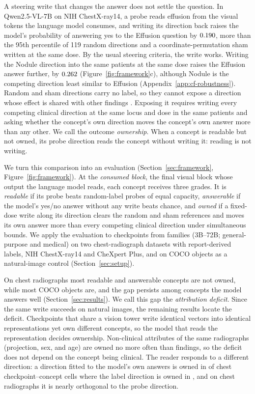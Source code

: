 \documentclass{article}
\begin{document}
A steering write that changes the answer does not settle the question. In Qwen2.5-VL-7B on NIH ChestX-ray14, a probe reads effusion from the visual tokens the language model consumes, and writing its direction back raises the model's probability of answering yes to the Effusion question by $0.190$, more than the 95th percentile of 119 random directions and a coordinate-permutation sham written at the same dose. By the usual steering criteria, the write works. Writing the Nodule direction into the same patients at the same dose raises the Effusion answer further, by $0.262$ (Figure~\ref{fig:framework}c), although Nodule is the competing direction least similar to Effusion (Appendix~\ref{app:cf-robustness}). Random and sham directions carry no label, so they cannot expose a direction whose effect is shared with other findings \citep{pahde2025navigating}. Exposing it requires writing every competing clinical direction at the same locus and dose in the same patients and asking whether the concept's own direction moves the concept's own answer more than any other. We call the outcome \emph{ownership}. When a concept is readable but not owned, its probe direction reads the concept without writing it: reading is not writing.

We turn this comparison into an evaluation (Section~\ref{sec:framework}, Figure~\ref{fig:framework}). At the \emph{consumed block}, the final visual block whose output the language model reads, each concept receives three grades. It is \emph{readable} if its probe beats random-label probes of equal capacity, \emph{answerable} if the model's yes/no answer without any write beats chance, and \emph{owned} if a fixed-dose write along its direction clears the random and sham references and moves its own answer more than every competing clinical direction under simultaneous bounds. We apply the evaluation to \cfCheckpoints{} checkpoints from \cfFamiliesWord{} families (3B--72B; general-purpose and medical) on two chest-radiograph datasets with report-derived labels, NIH ChestX-ray14 and CheXpert Plus, and on COCO objects as a natural-image control (Section~\ref{sec:setup}).

On chest radiographs most readable and answerable concepts are not owned, while most COCO objects are, and the gap persists among concepts the model answers well (Section~\ref{sec:results}). We call this gap the \emph{attribution deficit}. Since the same write succeeds on natural images, the remaining results locate the deficit. Checkpoints that share a vision tower write identical vectors into identical representations yet own different concepts, so the model that reads the representation decides ownership. Non-clinical attributes of the same radiographs (projection, sex, and age) are owned no more often than findings, so the deficit does not depend on the concept being clinical. The reader responds to a different direction: a direction fitted to the model's own answers is owned in \cfAnsChestOwnedA{} of \cfAnsChestN{} chest checkpoint--concept cells where the label direction is owned in \cfAnsChestOwnedLabel{}, and on chest radiographs it is nearly orthogonal to the probe direction.
\end{document}
